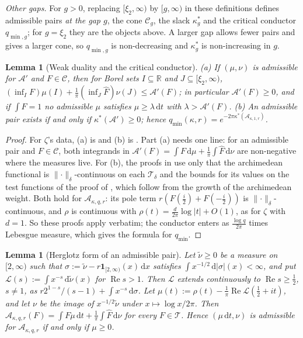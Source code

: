 \documentclass[11pt]{amsart}
\newcommand{\RR}{\mathbb R}
\newcommand{\dd}{\,\mathrm d}
\renewcommand{\Re}{\operatorname{Re}}
\newcommand{\one}{\mathbf 1}
\newcommand{\hF}{\widehat F}
\newcommand{\xin}[1]{\xi_{#1}}
\newcommand{\Arch}{\mathcal A}
\newcommand{\Tc}{\mathcal T}
\newcommand{\Cone}{\mathcal C}
\newcommand{\kstar}{\kappa^{*}}
\newcommand{\qmin}{q_{\min}}
\newtheorem{lemma}[theorem]{Lemma}
\theoremstyle{definition}
\theoremstyle{remark}
\numberwithin{equation}{section}
\begin{document}
\emph{Other gaps.} For $g>0$, replacing $[\xin2,\infty)$ by $[g,\infty)$ in these definitions defines admissible pairs \emph{at the gap $g$},
the cone $\Cone_g$, the slack $\kstar_g$ and the critical conductor $q_{\min,g}$; for $g=\xin2$ they are the objects above. A larger gap
allows fewer pairs and gives a larger cone, so $q_{\min,g}$ is non-decreasing and $\kstar_g$ is non-increasing in $g$.

\begin{lemma}[Weak duality and the critical conductor]\label{lem:weak-duality}
\textup{(a)} If $(\mu,\nu)$ is admissible for $\Arch'$ and $F\in\Cone$, then for Borel sets $I\subseteq\RR$ and
$J\subseteq[\xin2,\infty)$, $(\inf_IF)\mu(I)+\frac1\pi(\inf_J\hF)\nu(J)\le\Arch'(F)$; in particular $\Arch'(F)\ge0$, and if $\int F=1$ no
admissible $\mu$ satisfies $\mu\ge\lambda\dd t$ with $\lambda>\Arch'(F)$. \textup{(b)} An admissible pair exists if and only if
$\kstar(\Arch')\ge0$; hence $\qmin(\kappa,r)=e^{-2\pi\kstar(\Arch_{\kappa,1,r})}$.
\end{lemma}

\begin{proof}
For $\zeta$'s data, (a) is \cite[Lemma~2.5]{PaperI} and (b) is \cite[Theorem~2.7 and Proposition~2.10]{PaperI}. Part (a) needs one line:
for an admissible pair and $F\in\Cone$, both integrands in $\Arch'(F)=\int F\dd\mu+\frac1\pi\int\hF\dd\nu$ are non-negative where the
measures live. For (b), the proofs in \cite{PaperI} use only that the archimedean functional is $\lVert\cdot\rVert_\delta$-continuous on each
$\Tc_\delta$ and the bounds for its values on the test functions of the proof of \cite[Lemma~2.6]{PaperI}, which follow from the growth of
the archimedean weight. Both hold for $\Arch_{\kappa,q,r}$: its pole term $r(F(\frac i2)+F(-\frac i2))$ is $\lVert\cdot\rVert_\delta$-continuous, and
$\rho$ is continuous with $\rho(t)=\frac d{2\pi}\log\lvert t\rvert+O(1)$, as for $\zeta$ with $d=1$. So these proofs apply verbatim; the
conductor enters as $\frac{\log q}{2\pi}$ times Lebesgue measure, which gives the formula for $\qmin$.
\end{proof}

\begin{lemma}[Herglotz form of an admissible pair]\label{lem:herglotz}
Let $\tilde\nu\ge0$ be a measure on $[2,\infty)$ such that $\sigma:=\tilde\nu-r\one_{[2,\infty)}(x)\dd x$ satisfies
$\int x^{-1/2}\dd\lvert\sigma\rvert(x)<\infty$, and put $\mathcal L(s):=\int x^{-s}\dd\tilde\nu(x)$ for $\Re s>1$. Then $\mathcal L$ extends
continuously to $\Re s\ge\frac12$, $s\ne1$, as $r2^{1-s}/(s-1)+\int x^{-s}\dd\sigma$. Let $\mu(t):=\rho(t)-\frac1\pi\Re\mathcal L(\frac12+it)$,
and let $\nu$ be the image of $x^{-1/2}\tilde\nu$ under $x\mapsto\log x/2\pi$. Then $\Arch_{\kappa,q,r}(F)=\int F\mu\dd t+\frac1\pi\int\hF\dd\nu$
for every $F\in\Tc$. Hence $(\mu\dd t,\nu)$ is admissible for $\Arch_{\kappa,q,r}$ if and only if $\mu\ge0$.
\end{lemma}
\end{document}
